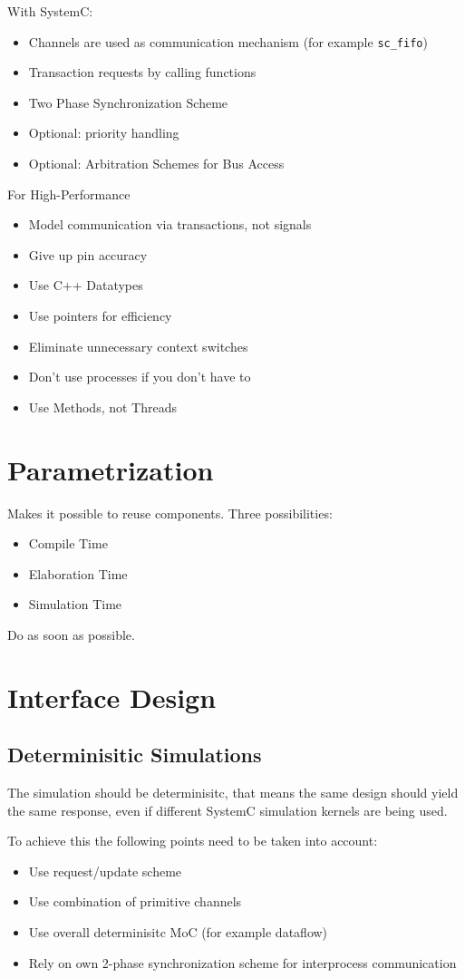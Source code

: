 With SystemC:
\begin{itemize}
    \item Channels are used as communication mechanism (for example \lstinline{sc_fifo})
    \item Transaction requests by calling functions
    \item Two Phase Synchronization Scheme
    \item Optional: priority handling
    \item Optional: Arbitration Schemes for Bus Access
\end{itemize}

For High-Performance
\begin{itemize}
    \item Model communication via transactions, not signals
    \item Give up pin accuracy
    \item Use C++ Datatypes
    \item Use pointers for efficiency
    \item Eliminate unnecessary context switches
    \item Don't use processes if you don't have to
    \item Use Methods, not Threads
\end{itemize}

\section{Parametrization}
Makes it possible to reuse components. Three possibilities:
\begin{itemize}
    \item Compile Time
    \item Elaboration Time
    \item Simulation Time
\end{itemize}
Do as soon as possible.

\section{Interface Design}
\subsection{Determinisitic Simulations}
The simulation should be determinisitc, that means the same design should yield the same response, even if different SystemC simulation kernels are being used.

To achieve this the following points need to be taken into account:
\begin{itemize}
    \item Use request/update scheme
    \item Use combination of primitive channels
    \item Use overall determinisitc MoC (for example dataflow)
    \item Rely on own 2-phase synchronization scheme for interprocess communication
\end{itemize}

